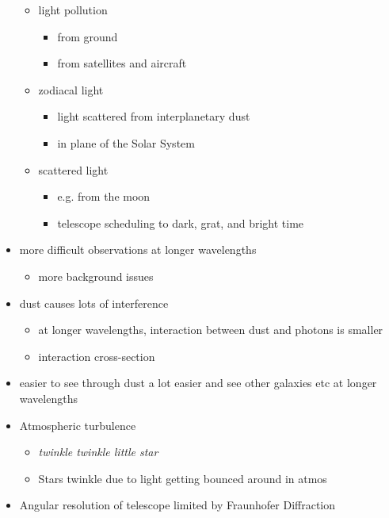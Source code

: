 \documentclass[a4paper,11pt,normalem]{article}
\begin{document}
\begin{itemize}
\begin{itemize}
            \item light pollution
                \begin{itemize}
                    \item from ground
                    \item from satellites and aircraft
                \end{itemize}
            \item zodiacal light
                \begin{itemize}
                    \item light scattered from interplanetary dust
                    \item in plane of the Solar System
                \end{itemize}
            \item scattered light
                \begin{itemize}
                    \item e.g. from the moon
                    \item telescope scheduling to dark, grat, and bright time
                \end{itemize}
        \end{itemize}
    \item more difficult observations at longer wavelengths
        \begin{itemize}
            \item more background issues
        \end{itemize}
    \item dust causes lots of interference
        \begin{itemize}
            \item at longer wavelengths, interaction between dust and photons is smaller
            \item interaction cross-section
        \end{itemize}
    \item easier to see through dust a lot easier and see other galaxies etc at longer wavelengths
    \item Atmospheric turbulence
        \begin{itemize}
            \item \emph{twinkle twinkle little star}
            \item Stars twinkle due to light getting bounced around in atmos
        \end{itemize}
    \item Angular resolution of telescope limited by Fraunhofer Diffraction

\end{itemize}
\end{document}
